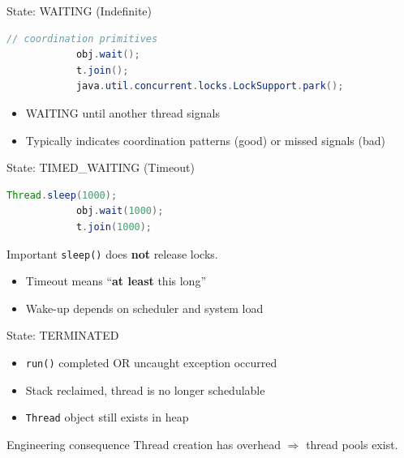 \documentclass[aspectratio=169,11pt]{beamer}
\begin{document}
	\begin{frame}[fragile]{State: WAITING (Indefinite)}
		\begin{lstlisting}[language=Java]
			// coordination primitives
			obj.wait();
			t.join();
			java.util.concurrent.locks.LockSupport.park();
		\end{lstlisting}
		
		\begin{itemize}
			\item WAITING until another thread signals
			\item Typically indicates coordination patterns (good) or missed signals (bad)
		\end{itemize}
	\end{frame}
	
	\begin{frame}[fragile]{State: TIMED\_WAITING (Timeout)}
		\begin{lstlisting}[language=Java]
			Thread.sleep(1000);
			obj.wait(1000);
			t.join(1000);
		\end{lstlisting}
		
		\begin{block}{Important}
			\texttt{sleep()} does \textbf{not} release locks.
		\end{block}
		
		\begin{itemize}
			\item Timeout means “\textbf{at least} this long”
			\item Wake-up depends on scheduler and system load
		\end{itemize}
	\end{frame}
	
	\begin{frame}{State: TERMINATED}
		\begin{itemize}
			\item \texttt{run()} completed OR uncaught exception occurred
			\item Stack reclaimed, thread is no longer schedulable
			\item \texttt{Thread} object still exists in heap
		\end{itemize}
		
		\vspace{3mm}
		\begin{block}{Engineering consequence}
			Thread creation has overhead $\Rightarrow$ thread pools exist.
		\end{block}
	\end{frame}
	
\end{document}
